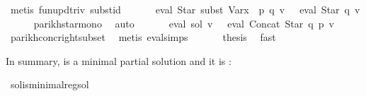 \begin{isabellebody}
\ {\isacharparenleft}{\kern0pt}metis\ fun{\isacharunderscore}{\kern0pt}upd{\isacharunderscore}{\kern0pt}triv\ subst{\isacharunderscore}{\kern0pt}id{\isacharparenright}{\kern0pt}\isanewline
\ \ \isamarkupfalse%
\ \isamarkupfalse%
\ {\isachardoublequoteopen}{\isasymPsi}\ {\isacharparenleft}{\kern0pt}eval\ {\isacharparenleft}{\kern0pt}Star\ {\isacharparenleft}{\kern0pt}subst\ {\isacharparenleft}{\kern0pt}Var{\isacharparenleft}{\kern0pt}x\ {\isacharcolon}{\kern0pt}{\isacharequal}{\kern0pt}\ p{\isacharparenright}{\kern0pt}{\isacharparenright}{\kern0pt}\ q{\isacharparenright}{\kern0pt}{\isacharparenright}{\kern0pt}\ v{\isacharparenright}{\kern0pt}\ {\isasymsubseteq}\ {\isasymPsi}\ {\isacharparenleft}{\kern0pt}eval\ {\isacharparenleft}{\kern0pt}Star\ q{\isacharparenright}{\kern0pt}\ v{\isacharparenright}{\kern0pt}{\isachardoublequoteclose}\isanewline
\ \ \ \ \isamarkupfalse%
\ parikh{\isacharunderscore}{\kern0pt}star{\isacharunderscore}{\kern0pt}mono\ \isamarkupfalse%
\ auto\isanewline
\ \ \isamarkupfalse%
\ \isamarkupfalse%
\ {\isachardoublequoteopen}{\isasymPsi}\ {\isacharparenleft}{\kern0pt}eval\ sol\ v{\isacharparenright}{\kern0pt}\ {\isasymsubseteq}\ {\isasymPsi}\ {\isacharparenleft}{\kern0pt}eval\ {\isacharparenleft}{\kern0pt}Concat\ {\isacharparenleft}{\kern0pt}Star\ q{\isacharparenright}{\kern0pt}\ p{\isacharparenright}{\kern0pt}\ v{\isacharparenright}{\kern0pt}{\isachardoublequoteclose}\isanewline
\ \ \ \ \isamarkupfalse%
\ parikh{\isacharunderscore}{\kern0pt}conc{\isacharunderscore}{\kern0pt}right{\isacharunderscore}{\kern0pt}subset\ \isamarkupfalse%
\ {\isacharparenleft}{\kern0pt}metis\ eval{\isachardot}{\kern0pt}simps{\isacharparenleft}{\kern0pt}{}{\isacharparenright}{\kern0pt}{\isacharparenright}{\kern0pt}\isanewline
\ \ \isamarkupfalse%
\ {}\ \isamarkupfalse%
\ {\isacharquery}{\kern0pt}thesis\ \isamarkupfalse%
\ fast\isanewline
{}\isamarkupfalse%
%
\endisatagproof
{\isafoldproof}%
%
\isadelimproof
%
\endisadelimproof
%
\begin{isamarkuptext}%
In summary,  is a minimal partial solution and it is :%
\end{isamarkuptext}\isamarkuptrue%
\isamarkupfalse%
\ sol{\isacharunderscore}{\kern0pt}is{\isacharunderscore}{\kern0pt}minimal{\isacharunderscore}{\kern0pt}reg{\isacharunderscore}{\kern0pt}sol{\isacharcolon}{\kern0pt}\isanewline

\end{isabellebody}
